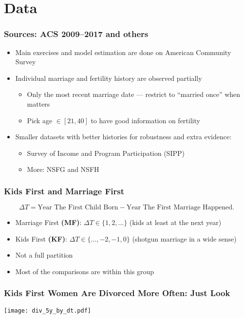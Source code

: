 \documentclass[aspectratio=169]{beamer}
\let\olditem\item
\renewcommand{\item}{%
\olditem\vspace{\fill}}
\begin{document}
\section{Data}
\begin{frame}
\frametitle{Sources: ACS 2009--2017 and others}
\begin{itemize}
\item Main exercises and model estimation are done on American Community Survey
\item Individual marriage and fertility history are observed partially
\begin{itemize}
\item Only the most recent marriage date --- restrict to ``married once'' when matters
\item Pick age $\in [21,40]$ to have good information on fertility
\end{itemize}
\item Smaller datasets with better histories for robustness and extra evidence:
\begin{itemize}
\item Survey of Income and Program Participation (SIPP)
\item More: NSFG and NSFH
\end{itemize}
\end{itemize}
\end{frame}

\begin{frame}[label=kfandmf]
\frametitle{Kids First and Marriage First}
\[\Delta T = \text{Year The First Child Born} - \text{Year The First Marriage Happened}.\]
\begin{itemize}
\item Marriage First \textbf{(MF)}: $\Delta T \in \{1,2,...\}$ (kids at least at the next year)
\item Kids First \textbf{(KF)}: $\Delta T \in \{...,-2,-1,0\}$ (shotgun marriage in a wide sense)
\item Not a full partition%
\item Most of the comparisons are within this group
\end{itemize}
\hyperlink{extra-restrictions}{} 
\end{frame}

\begin{frame}[label=dt_graph]
\frametitle{Kids First Women Are Divorced More Often: Just Look}
\begin{center}
\texttt{[image: div\_5y\_by\_dt.pdf]}
\end{center}
\vspace{-1cm}
\hyperlink{dt_graph_educ}{} 
\end{frame}
\end{document}
